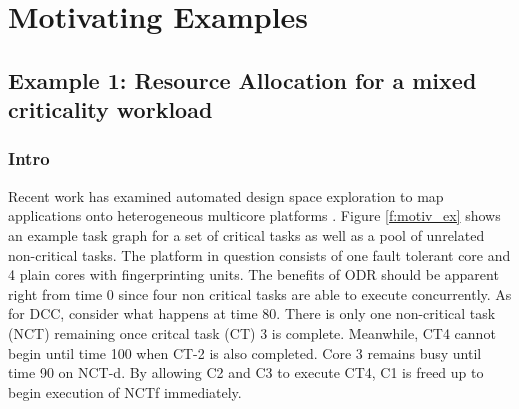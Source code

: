 
\chapter{Motivating Examples} %

\label{Chapter7} %


\section{Example 1: Resource Allocation for a mixed criticality workload}

\subsection{Intro}
Recent work has examined automated design space exploration to map applications onto heterogeneous multicore platforms \cite{bolchini2013reliability,huang2014framework}. Figure \ref{f:motiv_ex} shows an example task graph for a set of critical tasks as well as a pool of unrelated non-critical tasks. The platform in question consists of one fault tolerant core and 4 plain cores with fingerprinting units. The benefits of ODR should be apparent right from time 0 since four non critical tasks are able to execute concurrently. As for DCC, consider what happens at time 80. There is only one non-critical task (NCT) remaining once critcal task (CT) 3 is complete. Meanwhile, CT4 cannot begin until time 100 when CT-2 is also completed. Core 3 remains busy until time 90 on NCT-d. By allowing C2 and C3 to execute CT4, C1 is freed up to begin execution of NCTf immediately.

